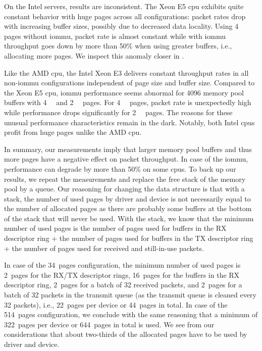 On the Intel servers, results are inconsistent. The Xeon E5 \ac{cpu} exhibits
quite constant behavior with huge pages across all configurations: packet rates
drop with increasing buffer sizes, possibly due to decreased data locality.
Using \SI{4}{\kibi\byte} pages without \ac{iommu}, packet rate is almost
constant while with \ac{iommu} throughput goes down by more than 50\% when using
greater buffers, i.e., allocating more pages. We inspect this anomaly closer in
.

Like the AMD \ac{cpu}, the Intel Xeon E3 delivers constant throughput rates in
all non-\ac{iommu} configurations independent of page size and buffer size.
Compared to the Xeon E5 \ac{cpu}, \ac{iommu} performance seems abnormal for
\SI{4096}{\byte} memory pool buffers with \SI{4}{\kibi\byte} and
\SI{2}{\mebi\byte} pages. For \SI{4}{\kibi\byte} pages, packet rate is
unexpectedly high while performance drops significantly for \SI{2}{\mebi\byte}
pages. The reasons for these unusual performance characteristics remain in the
dark. Notably, both Intel \acp{cpu} profit from huge pages unlike the AMD
\ac{cpu}.

In summary, our measurements imply that larger memory pool buffers and thus more
pages have a negative effect on packet throughput. In case of the \ac{iommu},
performance can degrade by more than 50\% on some \acp{cpu}. To back up our
results, we repeat the measurements and replace the free stack of the memory
pool by a queue. Our reasoning for changing the data structure is that with a
stack, the number of used pages by driver and device is not necessarily equal to
the number of allocated pages as there are probably some buffers at the bottom
of the stack that will never be used. With the stack, we know that the minimum
number of used pages is the number of pages used for buffers in the RX
descriptor ring + the number of pages used for buffers in the TX descriptor ring
+ the number of pages used for received and still-in-use packets.

In case of the 34~pages configuration, the minimum number of used pages is
2~pages for the RX/TX descriptor rings, 16~pages for the buffers in the RX
descriptor ring, 2~pages for a batch of 32 received packets, and 2~pages for a
batch of 32 packets in the transmit queue (as the transmit queue is cleaned
every 32 packets), i.e., 22~pages per device or 44~pages in total. In case of
the 514~pages configuration, we conclude with the same reasoning that a minimum
of 322~pages per device or 644~pages in total is used. We see from our
considerations that about two-thirds of the allocated pages have to be used by
driver and device.

